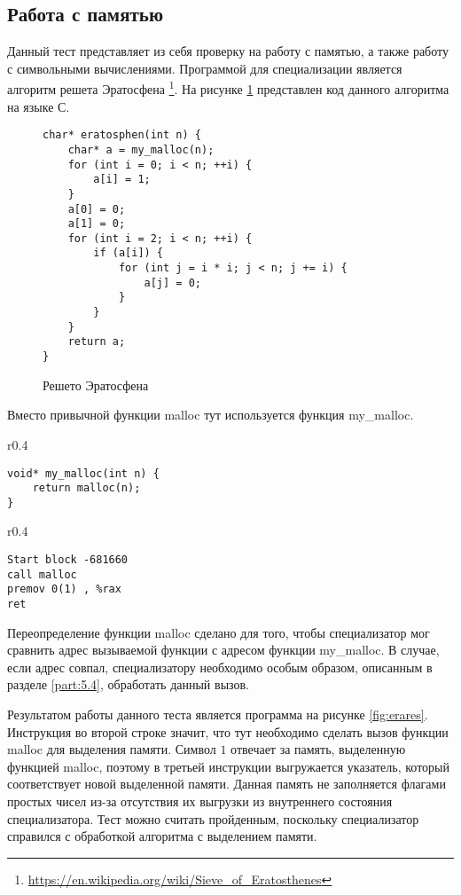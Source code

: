 \subsection{ Работа с памятью}

Данный тест представляет из себя проверку на работу с памятью, а также работу с символьными вычислениями. Программой для специализации является алгоритм решета Эратосфена \footnote{\url{https://en.wikipedia.org/wiki/Sieve_of_Eratosthenes}}. На рисунке \ref{fig:era} представлен код данного алгоритма на языке С.
\begin{figure}[h]
\begin{lstlisting}[xleftmargin = 20pt]
char* eratosphen(int n) {
    char* a = my_malloc(n);
    for (int i = 0; i < n; ++i) {
        a[i] = 1;
    }
    a[0] = 0;
    a[1] = 0;
    for (int i = 2; i < n; ++i) {
        if (a[i]) {
            for (int j = i * i; j < n; j += i) {
                a[j] = 0;
            }
        }
    }
    return a;
}
\end{lstlisting}
\caption{ Решето Эратосфена}
\label{fig:era}
\end{figure}
Вместо привычной функции malloc тут используется функция my\_malloc.
\begin{wrapfigure}{r}{0.4\textwidth}
\begin{lstlisting}[xleftmargin = 20pt]
void* my_malloc(int n) {
    return malloc(n);
}
\end{lstlisting}
\caption{ Функция my\_malloc}
\end{wrapfigure}
\begin{wrapfigure}{r}{0.4\textwidth}
\begin{lstlisting}[xleftmargin = 20pt]
Start block -681660
call malloc
premov 0(1) , %rax 
ret
\end{lstlisting}
\caption{Результат специализации}
\label{fig:erares}
\end{wrapfigure}
Переопределение функции malloc сделано для того, чтобы специализатор мог сравнить адрес вызываемой функции с адресом функции my\_malloc. В случае, если адрес совпал, специализатору необходимо особым образом, описанным в разделе \ref{part:5.4}, обработать данный вызов.


Результатом работы данного теста является программа на рисунке \ref{fig:erares}.
Инструкция во второй строке значит, что тут необходимо сделать вызов функции malloc для выделения памяти. Символ $1$ отвечает за память, выделенную функцией malloc, поэтому в третьей инструкции выгружается указатель, который соответствует новой выделенной памяти. Данная память не заполняется флагами простых чисел из-за отсутствия их выгрузки из внутреннего состояния специализатора. Тест можно считать пройденным, поскольку специализатор справился с обработкой алгоритма с выделением памяти.

